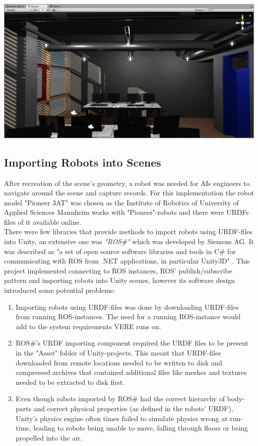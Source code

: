 \begin{center}
\noindent\includegraphics[width=14cm]{tex/img/ch05/UnitySceneA205_02.png}
\label{fig:unity-scene-a205}
\end{center}

\subsection{Importing Robots into Scenes}
After recreation of the scene's geometry, a robot was needed for \acp{AI} engineers to navigate around the scene and capture records. For this implementation the robot model "Pioneer 3AT" was chosen as the Institute of Robotics of University of Applied Sciences Mannheim works with "Pioneer"-robots and there were \acp{URDF} files of it available \cite{AmrRosConfig} online.\\
There were few libraries that provide methods to import robots using URDF-files into Unity, an extensive one was \textit{"ROS\#"} which was developed by Siemens AG. It was described as "a set of open source software libraries and tools in C# for communicating with ROS from .NET applications, in particular Unity3D" \cite{RosSharp}. This project implemented connecting to ROS instances, ROS' publish/subscribe pattern and importing robots into Unity scenes, however its software design introduced some potential problems: 
\begin{enumerate}
    \item Importing robots using URDF-files was done by downloading URDF-files from running ROS-instances. The need for a running ROS-instance would add to the system requirements VERE runs on.
    \item ROS\#'s URDF importing component required the URDF files to be present in the "Asset" folder of Unity-projects. This meant that URDF-files downloaded from remote locations needed to be written to disk and compressed archives that contained additional files like meshes and textures needed to be extracted to disk first.
    \item Even though robots imported by ROS\# had the correct hierarchy of body-parts and correct physical properties (as defined in the robots' URDF), Unity's physics engine often times failed to simulate physics wrong at run-time, leading to robots being unable to move, falling through floors or being propelled into the air.
\end{enumerate}

